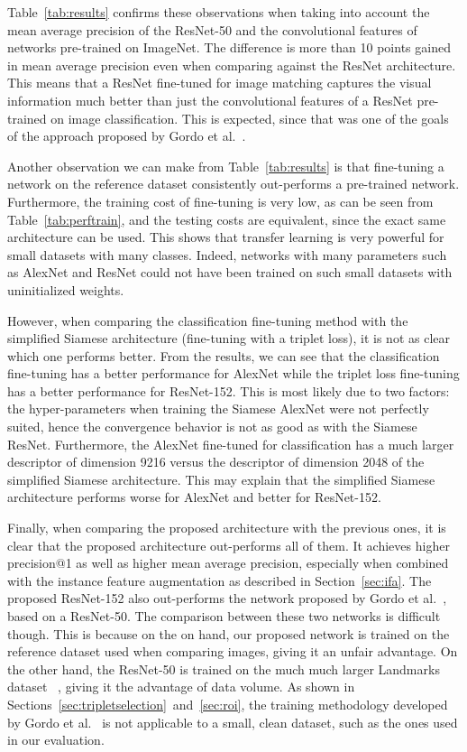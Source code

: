 Table~\ref{tab:results} confirms these observations when taking into
account the mean average precision of the ResNet-50
and the convolutional features of networks pre-trained on ImageNet.
The difference is more than 10 points gained in mean
average precision even when comparing against the ResNet architecture.
This means that a ResNet fine-tuned for image matching captures the
visual information much better than just the convolutional features
of a ResNet pre-trained on image classification.
This is expected, since that was one of the
goals of the approach proposed by Gordo et al.~\cite{gordo_deep_2016}.

Another observation we can make from Table~\ref{tab:results} is that
fine-tuning a network on the reference dataset consistently out-performs
a pre-trained network. Furthermore, the training cost of fine-tuning is
very low, as can be seen from Table~\ref{tab:perftrain}, and the testing
costs are equivalent, since the exact same architecture can be used.
This shows that transfer learning is very powerful for small datasets with
many classes. Indeed, networks with many parameters such as AlexNet and
ResNet could not have been trained on such small datasets with
uninitialized weights.

However, when comparing the classification fine-tuning method with the
simplified Siamese architecture (fine-tuning with a triplet loss),
it is not as clear which one performs better.
From the results, we can see that the classification fine-tuning has a better
performance for AlexNet while the triplet loss fine-tuning has a better
performance for ResNet-152. This is most likely due to two factors: the
hyper-parameters when training the Siamese AlexNet were not perfectly
suited, hence the convergence behavior is not as good as with the Siamese
ResNet. Furthermore, the AlexNet fine-tuned for classification has a much
larger descriptor of dimension 9216 versus the descriptor of dimension
2048 of the simplified Siamese architecture. This may explain that
the simplified Siamese architecture performs worse for AlexNet and
better for ResNet-152.

Finally, when comparing the proposed architecture with the previous ones,
it is clear that the proposed architecture out-performs all of them.
It achieves higher precision@1 as well as higher mean average precision,
especially when combined with the instance feature augmentation as described
in Section~\ref{sec:ifa}. The proposed ResNet-152 also out-performs the
network proposed by Gordo et al.~\cite{gordo_deep_2016}, based on a ResNet-50.
The comparison between these two networks is difficult though.
This is because on the on hand, our proposed
network is trained on the reference dataset used when comparing images,
giving it an unfair advantage. On the other hand, the ResNet-50
is trained on the much much larger Landmarks dataset
~\cite{babenko_neural_2014}, giving it the advantage of data volume.
As shown in Sections~\ref{sec:tripletselection}~and~\ref{sec:roi},
the training methodology developed by Gordo et al.~\cite{gordo_end--end_2017}
is not applicable to a small, clean dataset, such as the ones used in our
evaluation.

